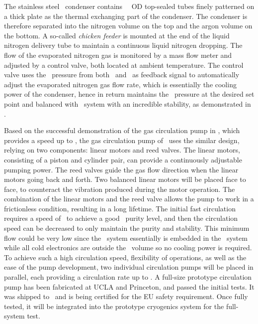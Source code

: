 The stainless steel \LAr\ condenser contains \DSkCondenserTubeNumber\ \DSkCryogenicsCondenserTubesDiameter\ OD top-sealed tubes finely patterned on a thick plate as the thermal exchanging part of the condenser.  The condenser is therefore separated into the nitrogen volume on the top and the argon volume on the bottom.  A so-called {\it chicken feeder} is mounted at the end of the liquid nitrogen delivery tube to maintain a continuous liquid nitrogen dropping.  The flow of the evaporated nitrogen gas is monitored by a mass flow meter and adjusted by a control valve, both located at ambient temperature.  The control valve uses the \LArTPC\ pressure from both \UAr\ and \AAr\ as feedback signal to automatically adjust the evaporated nitrogen gas flow rate, which is essentially the cooling power of the condenser, hence in return maintains the \LArTPC\ pressure at the desired set point and balanced with \AAr\ system with an incredible stability, as demonstrated in \DSfs.

Based on the successful demonstration of the gas circulation pump in \DSfs, which provides a speed up to \DSfCryogenicsGasFlowLINBoost, the gas circulation pump of \DSks\ uses the similar design, relying on two components: linear motors and reed valves.  The linear motors, consisting of a piston and cylinder pair, can provide a continuously adjustable pumping power.  The reed valves guide the gas flow direction when the linear motors going back and forth.  Two balanced linear motors will be placed face to face, to counteract the vibration produced during the motor operation. The combination of the linear motors and the reed valve allows the pump to work in a frictionless condition, resulting in a long lifetime.  The initial fast circulation requires a speed of \DSkCryogenicsGasFlowTotal\ to achieve a good \UAr\ purity level, and then the circulation speed can be decreased to only maintain the purity and stability. This minimum flow could be very low since the \UAr\ system essentially is embedded in the \AAr\ system while all cold electronics are outside the \UAr\ volume so no cooling power is required. To achieve such a high circulation speed, flexibility of operations, as well as the ease of the pump development, two individual circulation pumps will be placed in parallel, each providing a circulation rate up to \DSkCryogenicsQdriveSpeed.  A full-size prototype circulation pump has been fabricated at UCLA and Princeton, and passed the initial tests.  It was shipped to \CERN\ and is being certified for the EU safety requirement. Once fully tested,  it will be integrated into the prototype cryogenics system for the full-system test.

